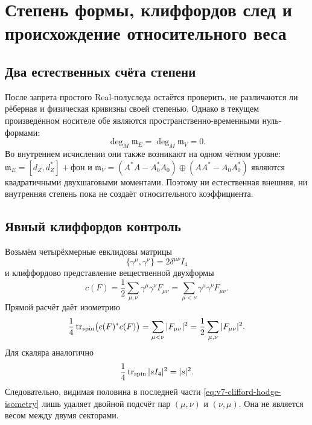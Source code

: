 \chapter{Степень формы, клиффордов след и происхождение относительного веса}
\label{ch:v7-clifford-form-degree-weight-origin-gate}

\section{Два естественных счёта степени}

После запрета простого Real-полуследа остаётся проверить, не различаются ли
рёберная и физическая кривизны своей степенью. Однако в текущем произведённом
носителе обе являются пространственно-временными нуль-формами:
\begin{equation}
 \deg_M\mathfrak m_E=\deg_M\mathfrak m_V=0.
 \label{eq:v7-clifford-common-spacetime-degree}
\end{equation}
Во внутреннем исчислении они также возникают на одном чётном уровне:
$\mathfrak m_E=[d_Z,d_Z^*]+\text{фон}$ и
$\mathfrak m_V=(A^*A-A_0^*A_0)\oplus(AA^*-A_0A_0^*)$ являются
квадратичными двухшаговыми моментами. Поэтому ни естественная внешняя, ни
внутренняя степень пока не создаёт относительного коэффициента.

\section{Явный клиффордов контроль}

Возьмём четырёхмерные евклидовы матрицы
\begin{equation}
 \{\gamma^\mu,\gamma^\nu\}=2\delta^{\mu\nu}I_4
 \label{eq:v7-clifford-relations}
\end{equation}
и клиффордово представление вещественной двухформы
\begin{equation}
 c(F)=\frac12\sum_{\mu,\nu}\gamma^\mu\gamma^\nu F_{\mu\nu}
 =\sum_{\mu<\nu}\gamma^\mu\gamma^\nu F_{\mu\nu}.
 \label{eq:v7-clifford-twoform-map}
\end{equation}
Прямой расчёт даёт изометрию
\begin{equation}
 \frac14\operatorname{tr}_{\rm spin}\bigl(c(F)^*c(F)\bigr)
 =\sum_{\mu<\nu}|F_{\mu\nu}|^2
 =\frac12\sum_{\mu,\nu}|F_{\mu\nu}|^2.
 \label{eq:v7-clifford-hodge-isometry}
\end{equation}
Для скаляра аналогично
\begin{equation}
 \frac14\operatorname{tr}_{\rm spin}|sI_4|^2=|s|^2.
 \label{eq:v7-clifford-scalar-isometry}
\end{equation}
Следовательно, видимая половина в последней части
\eqref{eq:v7-clifford-hodge-isometry} лишь удаляет двойной подсчёт пар
$(\mu,\nu)$ и $(\nu,\mu)$. Она не является весом между двумя секторами.

